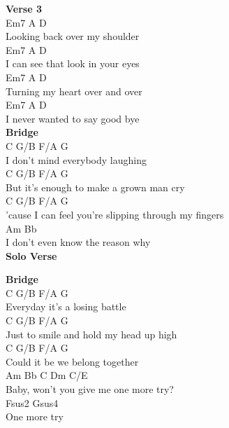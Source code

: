 \documentclass[a4paper]{article}
\begin{document}
{{        }
        \textbf{Verse 3}
        ~\\
        {
            \cutive
            \obeyspaces
        Em7  A       D
\\
Looking back over my shoulder
\\
Em7            A            D
\\
I can see that look in your eyes
\\
Em7              A        D
\\
Turning my heart over and over
\\
Em7            A           D
\\
I never wanted to say good bye
\\

        }
        \textbf{Bridge}
        ~\\
        {
            \cutive
            \obeyspaces
C         G/B  F/A       G
\\
  I don't mind everybody laughing
\\
C           G/B      F/A              G
\\
  But it's enough to make a grown man cry
\\
C              G/B         F/A                 G
\\
  'cause I can feel you're slipping through my fingers
\\
Am                           Bb
\\
I don't even know the reason why
\\

        }
        \textbf{Solo Verse}
        ~\\
        {
            \cutive
            \obeyspaces

        }
        \textbf{Bridge}
        ~\\
        {
            \cutive
            \obeyspaces
C      G/B F/A           G
\\
  Everyday it's a losing battle
\\
C         G/B       F/A             G
\\
  Just to smile and hold my head up high
\\
C          G/B F/A         G
\\
  Could it be  we belong together
\\
Am                               Bb    C Dm C/E
\\
Baby, won't you give me one more try?
\\
Fsus2         Gsus4
\\
One more try
\\

}}
\end{document}
